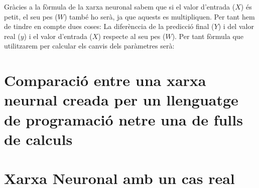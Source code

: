 Gràcies a la fòrmula de la xarxa neuronal sabem que si el valor d'entrada ($X$) és petit, el seu pes ($W$) també ho serà, ja que aquests es multipliquen. Per tant hem de tindre en compte dues coses: La diferènccia de la predicció final ($Y$) i del valor real ($y$) i el valor d'entrada ($X$) respecte al seu pes ($W$). Per tant fòrmula que utilitzarem per calcular els canvis dels paràmetres serà:

\section{Comparació entre una xarxa neurnal creada per un llenguatge de programació netre una de fulls de calculs}

\section{Xarxa Neuronal amb un cas real}\label{sec:12}
